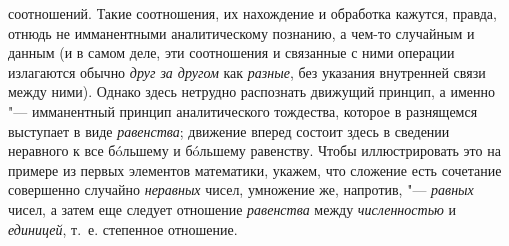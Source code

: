 {{соотношений. Такие соотношения, их нахождение и обработка кажутся, правда,
отнюдь не имманентными аналитическому познанию, а чем-то
случайным и данным (и в самом деле, эти соотношения и связанные с ними
операции излагаются обычно {\em друг за
другом} как
{\em разные}, без
указания внутренней связи между ними). Однако здесь нетрудно распознать
движущий принцип, а именно "--- имманентный принцип
аналитического тождества, которое в разнящемся выступает в виде
{\em равенства}; движение
вперед состоит здесь в сведении неравного к все бóльшему и бóльшему
равенству. Чтобы иллюстрировать это на примере из первых элементов
математики, укажем, что сложение есть сочетание совершенно случайно
{\em неравных} чисел,
умножение же, напротив, "--- {\em равных}
чисел, а затем еще следует отношение
{\em равенства} между
{\em численностью} и
{\em единицей}, т.~е.
степенное
отношение.

}}
